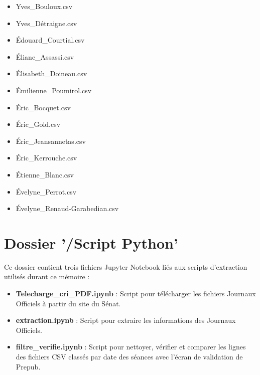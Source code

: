 \documentclass[a4paper,12pt,twoside]{book}
\newcommand{\clearemptydoublepage}{\newpage{\pagestyle{empty}\cleardoublepage}}
\begin{document}
\begin{itemize}
  \item Yves\_Bouloux.csv
  \item Yves\_Détraigne.csv
  \item Édouard\_Courtial.csv
  \item Éliane\_Assassi.csv
  \item Élisabeth\_Doineau.csv
  \item Émilienne\_Poumirol.csv
  \item Éric\_Bocquet.csv
  \item Éric\_Gold.csv
  \item Éric\_Jeansannetas.csv
  \item Éric\_Kerrouche.csv
  \item Étienne\_Blanc.csv
  \item Évelyne\_Perrot.csv
  \item Évelyne\_Renaud-Garabedian.csv
\end{itemize}

\section*{Dossier '/Script Python'}
Ce dossier contient trois fichiers Jupyter Notebook liés aux scripts d'extraction utilisés durant ce mémoire :
\begin{itemize}
  \item \textbf{Telecharge\_cri\_PDF.ipynb} : Script pour télécharger les fichiers Journaux Officiels à partir du site du Sénat.
  \item \textbf{extraction.ipynb} : Script pour extraire les informations des Journaux Officiels.
  \item \textbf{filtre\_verifie.ipynb} : Script pour nettoyer, vérifier et comparer les lignes des fichiers CSV classés par date des séances avec l'écran de validation de Prepub.
\end{itemize}

	
	\clearemptydoublepage
	\backmatter

	
 	\printglossaries

        \tableofcontents
	\listoffigures
	\listoftables
\end{document}
